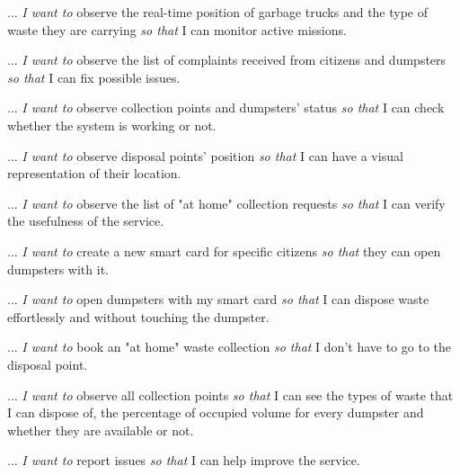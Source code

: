 \begin{story}
    ... \textit{I want to} observe the real-time position of garbage trucks and the type of waste they are carrying \textit{so that} I can monitor active missions.
\end{story}
\begin{story}
    ... \textit{I want to} observe the list of complaints received from citizens and dumpsters \textit{so that} I can fix possible issues.
\end{story}
\begin{story}
    ... \textit{I want to} observe collection points and dumpsters' status \textit{so that} I can check whether the system is working or not.
\end{story}
\begin{story}
    ... \textit{I want to} observe disposal points' position \textit{so that} I can have a visual representation of their location.
\end{story}
\begin{story}
    ... \textit{I want to} observe the list of "at home" collection requests \textit{so that} I can verify the usefulness of the service.
\end{story}
\begin{story}
    ... \textit{I want to} create a new smart card for specific citizens \textit{so that} they can open dumpsters with it.
\end{story}

\begin{story}
    ... \textit{I want to} open dumpsters with my smart card \textit{so that} I can dispose waste effortlessly and without touching the dumpster.
\end{story}
\begin{story}
    ... \textit{I want to} book an "at home" waste collection \textit{so that} I don't have to go to the disposal point.
\end{story}
\begin{story}
    ... \textit{I want to} observe all collection points \textit{so that} I can see the types of waste that I can dispose of, the percentage of occupied volume for every dumpster and whether they are available or not.
\end{story}
\begin{story}
    ... \textit{I want to} report issues \textit{so that} I can help improve the service.
\end{story}


